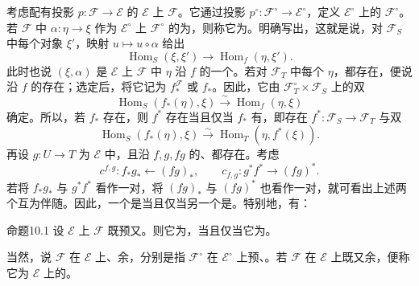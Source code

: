 考虑配有投影 $p:\mathcal F\to\mathcal E$ 的 $\mathcal E$ 上 $\mathcal F$。它通过投影 $p^\circ:\mathcal F^\circ\to\mathcal E^\circ$，定义 $\mathcal E^\circ$ 上的 $\mathcal F^\circ$。若 $\mathcal F$ 中 $\alpha:\eta\to\xi$ 作为 $\mathcal E^\circ$ 上 $\mathcal F^\circ$ 的为，则称它为。明确写出，这就是说，对 $\mathcal F_S$ 中每个对象 $\xi'$，映射 $u\mapsto u\circ\alpha$ 给出
\[
 \operatorname{Hom}_S(\xi,\xi')\longrightarrow\operatorname{Hom}_f(\eta,\xi').
\]
此时也说 $(\xi,\alpha)$ 是 $\mathcal E$ 上 $\mathcal F$ 中 $\eta$ 沿 $f$ 的一个。若对 $\mathcal F_T$ 中每个 $\eta$，都存在，便说沿 $f$ 的存在；选定后，将它记为 $f_*^{\mathcal F}$ 或 $f_*$。因此，它由 $\mathcal F_T^\circ\times\mathcal F_S$ 上的双
\[
 \operatorname{Hom}_S(f_*(\eta),\xi)\xrightarrow{\sim}\operatorname{Hom}_f(\eta,\xi)
\]
确定。所以，若 $f_*$ 存在，则 $f^*$ 存在当且仅当 $f_*$ 有，即存在 $f^*:\mathcal F_S\to\mathcal F_T$ 与双
\[
 \operatorname{Hom}_S(f_*(\eta),\xi)\xrightarrow{\sim}
 \operatorname{Hom}_T(\eta,f^*(\xi)).
\]
再设 $g:U\to T$ 为 $\mathcal E$ 中，且沿 $f,g,fg$ 的、都存在。考虑
\[
 c^{f,g}:f_*g_*\longleftarrow(fg)_*,\qquad
 c_{f,g}:g^*f^*\longrightarrow(fg)^*.
\]
若将 $f_*g_*$ 与 $g^*f^*$ 看作一对，将 $(fg)_*$ 与 $(fg)^*$ 也看作一对，就可看出上述两个互为伴随。因此，一个是当且仅当另一个是。特别地，有：

\begin{SGAresult}{命题}{10.1}
设 $\mathcal E$ 上 $\mathcal F$ 既预又。则它为，当且仅当它为。
\end{SGAresult}
当然，说 $\mathcal F$ 在 $\mathcal E$ 上、余，分别是指 $\mathcal F^\circ$ 在 $\mathcal E^\circ$ 上预、。若 $\mathcal F$ 在 $\mathcal E$ 上既又余，便称它为 $\mathcal E$ 上的。

